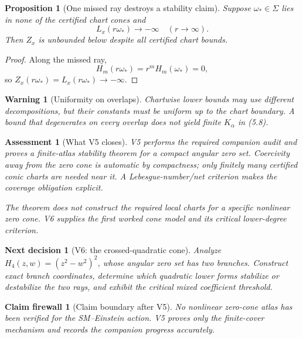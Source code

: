 \documentclass[11pt]{article}
\newtheorem{proposition}[theorem]{Proposition}
\newtheorem{warning}[theorem]{Warning}
\newtheorem{firewall}[theorem]{Claim firewall}
\newtheorem{decision}[theorem]{Next decision}
\newtheorem{assessment}[theorem]{Assessment}
\theoremstyle{remark}
\begin{document}
\begin{proposition}[One missed ray destroys a stability claim]
\label{prop:v17v5-missed}
Suppose \(\omega_*\in\Sigma\) lies in none of the certified chart
cones and
\[
 L_x(r\omega_*)\longrightarrow-\infty
 \quad(r\to\infty).
\]
Then \(Z_x\) is unbounded below despite all certified chart bounds.
\end{proposition}

\begin{proof}
Along the missed ray,
\[
 H_m(r\omega_*)=r^mH_m(\omega_*)=0,
\]
so \(Z_x(r\omega_*)=L_x(r\omega_*)\to-\infty\).
\end{proof}

\begin{warning}[Uniformity on overlaps]
\label{warn:v17v5-overlaps}
Chartwise lower bounds may use different decompositions, but their
constants must be uniform up to the chart boundary.  A bound that
degenerates on every overlap does not yield finite
\(K_\alpha\) in (5.8).
\end{warning}

\begin{assessment}[What V5 closes]
\label{ass:v17v5-status}
V5 performs the required companion audit and proves a finite-atlas
stability theorem for a compact angular zero set.  Coercivity away
from the zero cone is automatic by compactness; only finitely many
certified conic charts are needed near it.  A Lebesgue-number/net
criterion makes the coverage obligation explicit.

The theorem does not construct the required local charts for a
specific nonlinear zero cone.  V6 supplies the first worked cone
model and its critical lower-degree criterion.
\end{assessment}

\begin{decision}[V6: the crossed-quadratic cone]
\label{dec:v17v5-next}
Analyze
\(H_4(z,w)=(z^2-w^2)^2\), whose angular zero set has two branches.
Construct exact branch coordinates, determine which quadratic
lower forms stabilize or destabilize the two rays, and exhibit the
critical mixed coefficient threshold.
\end{decision}

\begin{firewall}[Claim boundary after V5]
\label{fire:v17v5}
No nonlinear zero-cone atlas has been verified for the
SM--Einstein action.  V5 proves only the finite-cover mechanism and
records the companion progress accurately.
\end{firewall}
\end{document}
